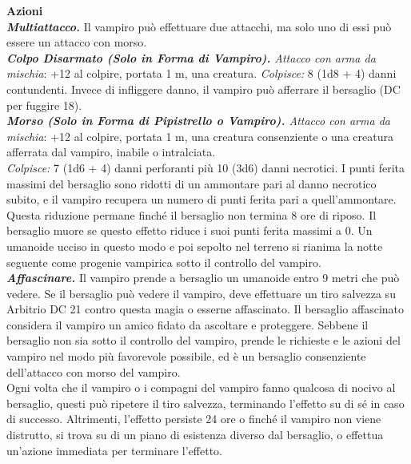\begin{multicols}{2}
\smallskip\textbf{Azioni}\\
\emph{\textbf{Multiattacco.}} Il vampiro può effettuare due attacchi, ma solo uno di essi può essere un attacco con morso.\\
\emph{\textbf{Colpo Disarmato (Solo in Forma di Vampiro).} Attacco con arma da mischia}: +12 al colpire, portata 1 m, una creatura. \emph{Colpisce:} 8 (1d8 + 4) danni contundenti. Invece di infliggere danno, il vampiro può afferrare il bersaglio (DC per fuggire 18).\\
\emph{\textbf{Morso (Solo in Forma di Pipistrello o Vampiro).} Attacco con arma da mischia}: +12 al colpire, portata 1 m, una creatura consenziente o una creatura afferrata dal vampiro, inabile o intralciata.\\

\emph{Colpisce:} 7 (1d6 + 4) danni perforanti più 10 (3d6) danni necrotici. I punti ferita massimi del bersaglio sono ridotti di un ammontare pari al danno necrotico subito, e il vampiro recupera un numero di punti ferita pari a quell'ammontare. Questa riduzione permane finché il bersaglio non termina 8 ore di riposo. Il bersaglio muore se questo effetto riduce i suoi punti ferita massimi a 0. Un umanoide ucciso in questo modo e poi sepolto nel terreno si rianima la notte seguente come progenie vampirica sotto il controllo del vampiro. \\

\emph{\textbf{Affascinare.}} Il vampiro prende a bersaglio un umanoide entro 9 metri che può vedere. Se il bersaglio può vedere il vampiro, deve effettuare un tiro salvezza su Arbitrio DC  21 contro questa magia o esserne affascinato. Il bersaglio affascinato considera il vampiro un amico fidato da ascoltare e proteggere. Sebbene il bersaglio non sia sotto il controllo del vampiro, prende le richieste e le azioni del vampiro nel modo più favorevole possibile, ed è un bersaglio consenziente dell'attacco con morso del vampiro.\\

Ogni volta che il vampiro o i compagni del vampiro fanno qualcosa di nocivo al bersaglio, questi può ripetere il tiro salvezza, terminando l'effetto su di sé in caso di successo. Altrimenti, l'effetto persiste 24 ore o finché il vampiro non viene distrutto, si trova su di un piano di esistenza diverso dal bersaglio, o effettua un'azione immediata per terminare l'effetto.\\


\end{multicols}
